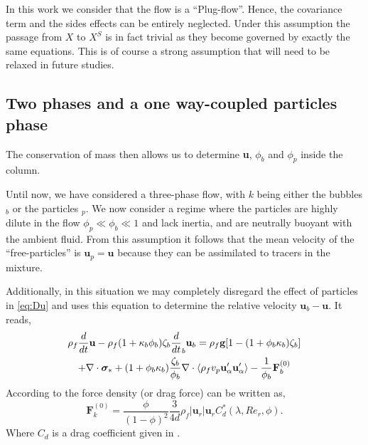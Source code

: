 In this work we consider that the flow is a ``Plug-flow''. 
Hence, the covariance term and the sides effects can be entirely neglected. 
Under this assumption the passage from $X$ to $X^S$ is in fact trivial as they become governed by exactly the same equations. 
This is of course a strong assumption that will need to be relaxed in future studies. 


\subsection{Two phases and a one way-coupled particles phase}

The conservation of mass then allows us to determine \textbf{u}, $\phi_b$ and $\phi_p$ inside the column. 

Until now, we have considered a three-phase flow, with $k$ being either the bubbles $_b$ or the particles $_p$. 
We now consider a regime where the particles are highly dilute in the flow  $\phi_p \ll \phi_b \ll 1$ and lack inertia, and are neutrally buoyant with the ambient fluid. 
From this assumption it follows that the mean velocity of the ``free-particles'' is $\textbf{u}_p = \textbf{u}$ because they can be assimilated to tracers in the mixture. 

Additionally, in this situation we may completely disregard the effect of particles in \ref{eq:Du} and uses this equation to determine the relative velocity $\textbf{u}_b - \textbf{u}$. 
It reads, 
\begin{multline*}
    \rho_f  \frac{d}{dt} \textbf{u}
    - \rho_f (1+\kappa_b\phi_b) \zeta_b \frac{d}{dt}_b \textbf{u}_b
    =
    \rho_f \textbf{g}[1- (1+\phi_b\kappa_b)\zeta_b]\\
    +\mathbf{\nabla}\cdot \bm\sigma_*
    +(1+\phi_b\kappa_b)\frac{\zeta_b}{\phi_b}\mathbf{\nabla}\cdot \left<\rho_f v_p \textbf{u}_\alpha' \textbf{u}_\alpha'\right>
    - \frac{1}{\phi_b}  \textbf{F}_{b}^{(0)}
\end{multline*}
According to \citet[Chapter 8]{fintzi2025} the force density (or drag force) can be written as,
\begin{equation}
    \textbf{F}_{k}^{(0)} 
    = \frac{\phi}{(1-\phi)^2} \frac{3}{4d}\rho_f |\textbf{u}_r| \textbf{u}_r  C_d^*(\lambda,Re_{r},\phi). 
\end{equation}
Where $C_d$ is a drag coefficient given in \citet[Chapter 8]{fintzi2025}. 

